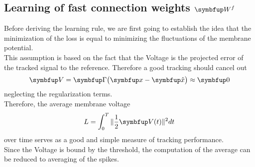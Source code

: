 \subsection{Learning of fast connection weights $\bmu{W}^f$}
Before deriving the learning rule, we are first going to establish the idea that the minimization of the loss is equal to minimizing the fluctuations of the membrane potential.\\
This assumption is based on the fact that the Voltage is the projected error of the tracked signal to the reference. Therefore a good tracking should cancel out
\begin{equation}
	\bmu{V} = \bmu{\Gamma}\big(\bmu{x} - \bmu{\hat{x}}\big) \approx \bmu{0}
\end{equation}
neglecting the regularization terms.\\
Therefore, the average membrane voltage
\begin{equation}
	L = \int_0^T\|\frac{1}{2}\bmu{V}(t)\|^2dt
\end{equation}
over time serves as a good and simple measure of tracking performance.\\
Since the Voltage is bound by the threshold, the computation of the average can be reduced to averaging of the spikes.\\
